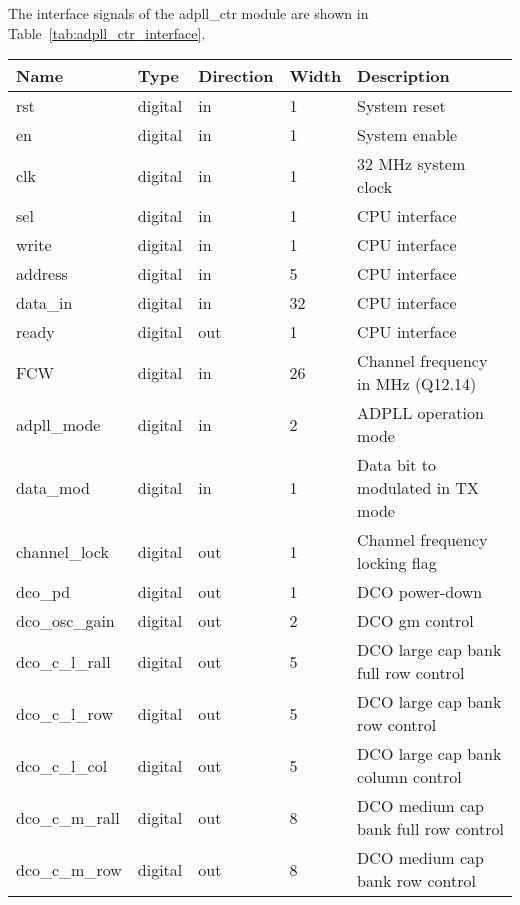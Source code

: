 The interface signals of the adpll\_ctr module  are
shown in Table~\ref{tab:adpll_ctr_interface}. 

\begin{table}[!h]
  \centering
    \begin{tabular}{|p{3cm}|p{1.5cm}|p{2cm}|p{1.5cm}|p{7cm}|}
      \hline
      \rowcolor{tab-green}
    {\bf Name} & {\bf Type} & {\bf Direction} & {\bf Width} & {\bf Description} \\
    \hline \hline 
    rst & digital & in & 1 & System reset\\
    \hline
    en & digital & in & 1 & System enable \\
    \hline
    clk &  digital & in & 1 & 32 MHz system clock \\
    \hline
    sel &  digital & in & 1 & CPU interface \\
    \hline
    write &  digital & in & 1 & CPU interface \\
    \hline
    address &  digital & in & 5 & CPU interface \\
    \hline
    data\_in &  digital & in & 32 & CPU interface \\
    \hline
    ready &  digital & out & 1 & CPU interface \\
    \hline
    FCW &  digital & in &  26 & Channel frequency in MHz (Q12.14) \\
    \hline
    adpll\_mode & digital & in & 2 & ADPLL operation mode \\
    \hline
    data\_mod & digital & in & 1 & Data bit to modulated in TX mode\\
    \hline
    channel\_lock & digital & out & 1 & Channel frequency locking flag \\
    \hline
    dco\_pd & digital & out  & 1 & DCO power-down\\
    \hline
    dco\_osc\_gain & digital & out  & 2 & DCO gm control\\
    \hline
    dco\_c\_l\_rall & digital & out  & 5 & DCO large cap bank full row control\\
    \hline
    dco\_c\_l\_row & digital & out  & 5 & DCO large cap bank row control\\
    \hline
    dco\_c\_l\_col & digital & out  & 5 & DCO large cap bank column control\\
    \hline
    dco\_c\_m\_rall & digital & out  & 8 & DCO medium cap bank full row control\\
    \hline
    dco\_c\_m\_row & digital & out  & 8 & DCO medium cap bank row control\\

\end{tabular}
\end{table}
